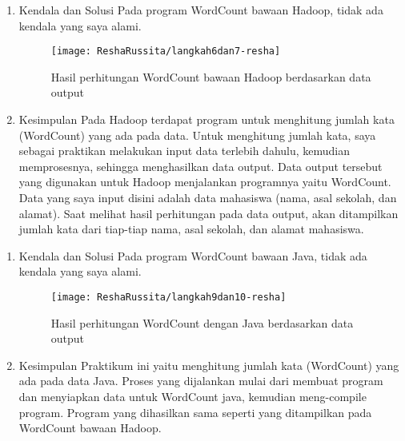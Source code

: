\begin{enumerate}
\item Kendala dan Solusi
\newline Pada program WordCount bawaan Hadoop, tidak ada kendala yang saya alami.

\begin{figure}[!ht]
\texttt{[image: ReshaRussita/langkah6dan7-resha]}
\caption{Hasil perhitungan WordCount bawaan Hadoop berdasarkan data output}
\label{gam:perkuliahan-08-12}
\end{figure}

\item Kesimpulan
\newline Pada Hadoop terdapat program untuk menghitung jumlah kata (WordCount) yang ada pada data. Untuk menghitung jumlah kata, saya sebagai praktikan melakukan input data terlebih dahulu, kemudian memprosesnya, sehingga menghasilkan data output. Data output tersebut yang digunakan untuk Hadoop menjalankan programnya yaitu WordCount.
Data yang saya input disini adalah data mahasiswa (nama, asal sekolah, dan alamat). Saat melihat hasil perhitungan pada data output, akan ditampilkan jumlah kata dari tiap-tiap nama, asal sekolah, dan alamat mahasiswa.

\end{enumerate}

\begin{enumerate}
\item Kendala dan Solusi
\newline Pada program WordCount bawaan Java, tidak ada kendala yang saya alami.

\begin{figure}[!ht]
\texttt{[image: ReshaRussita/langkah9dan10-resha]}
\caption{Hasil perhitungan WordCount dengan Java berdasarkan data output}
\label{gam:perkuliahan-08-12}
\end{figure}

\item Kesimpulan
\newline Praktikum ini yaitu menghitung jumlah kata (WordCount) yang ada pada data Java. Proses yang dijalankan mulai dari membuat program dan menyiapkan data untuk WordCount java, kemudian meng-compile program. Program yang dihasilkan sama seperti yang ditampilkan pada WordCount bawaan Hadoop.
\end{enumerate}
